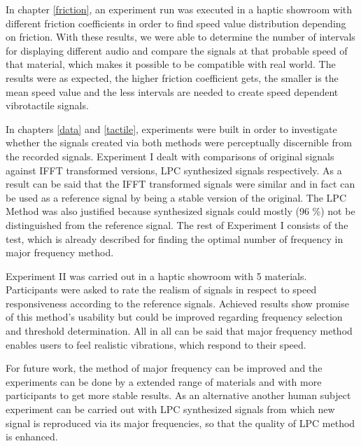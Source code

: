In chapter \ref{friction}, an experiment run was executed in a haptic showroom with different friction coefficients in order to find speed value distribution depending on friction. With these results, we were able to determine the number of intervals for displaying different audio and compare the signals at that probable speed of that material, which makes it possible to be compatible with real world. The results were as expected, the higher friction coefficient gets, the smaller is the mean speed value and the less intervals are needed to create speed dependent vibrotactile signals.

In chapters \ref{data} and \ref{tactile}, experiments were built in order to investigate whether the signals created via both methods were perceptually discernible from the recorded signals. Experiment I dealt with comparisons of original signals against IFFT transformed versions, LPC synthesized signals respectively. As a result can be said that the IFFT transformed signals were similar and in fact can be used as a reference signal by being a stable version of the original. The LPC Method was also justified because synthesized signals could mostly (96 \%) not be distinguished from the reference signal. The rest of Experiment I consists of the test, which is already described for finding the optimal number of frequency in major frequency method. 

Experiment II was carried out in a haptic showroom with 5 materials. Participants were asked to rate the realism of signals in respect to speed responsiveness according to the reference signals. Achieved results show promise of this method's usability but could be improved regarding frequency selection and threshold determination. All in all can be said that major frequency method enables users to feel realistic vibrations, which respond to their speed.

For future work, the method of major frequency can be improved and the experiments can be done by a extended range of materials and with more participants to get more stable results. As an alternative another human subject experiment can be carried out with LPC synthesized signals from which new signal is reproduced via its major frequencies, so that the quality of LPC method is enhanced.  







